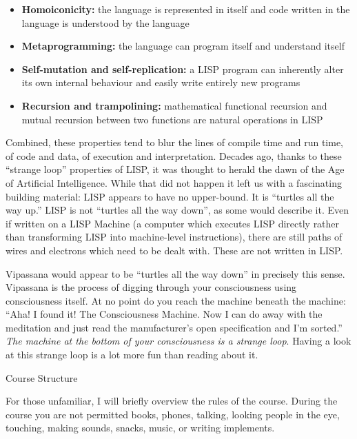 \documentclass{article}
\begin{document}
\begin{itemize}
\item \textbf{Homoiconicity:} the language is represented in itself and code written in the language is understood by the language
\item \textbf{Metaprogramming:} the language can program itself and understand itself
\item \textbf{Self-mutation and self-replication:} a LISP program can inherently alter its own internal behaviour and easily write entirely new programs
\item \textbf{Recursion and trampolining:} mathematical functional recursion and mutual recursion between two functions are natural operations in LISP
\end{itemize}

Combined, these properties tend to blur the lines of compile time and run time, of code and data, of execution and interpretation. Decades ago, thanks to these ``strange loop'' properties of LISP, it was thought to herald the dawn of the Age of Artificial Intelligence. While that did not happen it left us with a fascinating building material: LISP appears to have no upper-bound. It is ``turtles all the way up.'' LISP is not ``turtles all the way down'', as some would describe it. Even if written on a LISP Machine (a computer which executes LISP directly rather than transforming LISP into machine-level instructions), there are still paths of wires and electrons which need to be dealt with. These are not written in LISP.

Vipassana would appear to be ``turtles all the way down'' in precisely this sense. Vipassana is the process of digging through your consciousness using consciousness itself. At no point do you reach the machine beneath the machine: ``Aha! I found it! The Consciousness Machine. Now I can do away with the meditation and just read the manufacturer's open specification and I'm sorted.'' \textit{The machine at the bottom of your consciousness is a strange loop}. Having a look at this strange loop is a lot more fun than reading about it.

\pagebreak

\begin{center}
  \Huge{Course Structure}
\end{center}

For those unfamiliar, I will briefly overview the rules of the course. During the course you are not permitted books, phones, talking, looking people in the eye, touching, making sounds, snacks, music, or writing implements.
\end{document}
